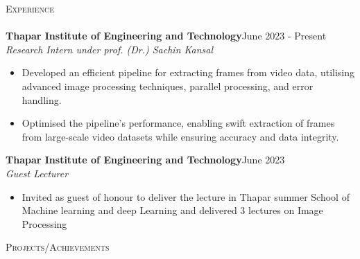\documentclass[a4paper]{article}
\newcommand{\lineunder} {
    \vspace*{-8pt} \\
    \hspace*{-18pt} \hrulefill \\
}
\newcommand{\header} [1] {
    {\hspace*{-18pt}\vspace*{6pt} \textsc{#1}}
    \vspace*{-6pt} \lineunder
}
\begin{document}
\vspace{0.5mm}
\header{Experience}


{\textbf{Thapar Institute of Engineering and Technology}}\hfill June 2023 - Present \\
 {\textit{Research Intern under prof. (Dr.) Sachin Kansal }}  \
\vspace{-2.5mm}
\begin{itemize} 
\item Developed an efficient pipeline for extracting frames from video data, utilising advanced image processing techniques, parallel processing, and error handling. 
\vspace{-2mm}
\item Optimised the pipeline's performance, enabling swift extraction of frames from large-scale video datasets while ensuring accuracy and data integrity.
\end{itemize}
{\textbf{Thapar Institute of Engineering and Technology}}\hfill June 2023 \\
 {\textit{Guest Lecturer}}  \
\vspace{-1.5mm}
\begin{itemize} 
\item Invited as guest of  honour to deliver the lecture in Thapar summer School of Machine learning and deep Learning and delivered 3 lectures on Image Processing
\end{itemize}

\header{Projects/Achievements}
\end{document}
